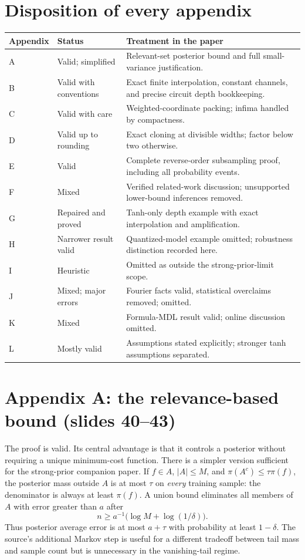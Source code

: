 \documentclass[11pt]{article}
\begin{document}
\section*{Disposition of every appendix}
\small
\begin{tabularx}{\textwidth}{@{}l l X@{}}
\toprule
Appendix & Status & Treatment in the paper\\
\midrule
A & Valid; simplified & Relevant-set posterior bound and full small-variance justification.\\
B & Valid with conventions & Exact finite interpolation, constant channels, and precise circuit depth bookkeeping.\\
C & Valid with care & Weighted-coordinate packing; infima handled by compactness.\\
D & Valid up to rounding & Exact cloning at divisible widths; factor below two otherwise.\\
E & Valid & Complete reverse-order subsampling proof, including all probability events.\\
F & Mixed & Verified related-work discussion; unsupported lower-bound inferences removed.\\
G & Repaired and proved & Tanh-only depth example with exact interpolation and amplification.\\
H & Narrower result valid & Quantized-model example omitted; robustness distinction recorded here.\\
I & Heuristic & Omitted as outside the strong-prior-limit scope.\\
J & Mixed; major errors & Fourier facts valid, statistical overclaims removed; omitted.\\
K & Mixed & Formula-MDL result valid; online discussion omitted.\\
L & Mostly valid & Assumptions stated explicitly; stronger tanh assumptions separated.\\
\bottomrule
\end{tabularx}
\normalsize

\section{Appendix A: the relevance-based bound (slides 40--43)}
The proof is valid. Its central advantage is that it controls a posterior without requiring a unique minimum-cost function. There is a simpler version sufficient for the strong-prior companion paper. If $f\in A$, $|A|\leq M$, and $\pi(A^c)\leq\tau\pi(f)$, the posterior mass outside $A$ is at most $\tau$ on \emph{every} training sample: the denominator is always at least $\pi(f)$. A union bound eliminates all members of $A$ with error greater than $a$ after
\[
 n\geq a^{-1}\bigl(\log M+\log(1/\delta)\bigr).
\]
Thus posterior average error is at most $a+\tau$ with probability at least $1-\delta$. The source's additional Markov step is useful for a different tradeoff between tail mass and sample count but is unnecessary in the vanishing-tail regime.
\end{document}
